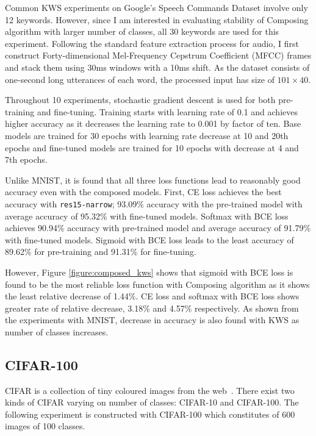 \documentclass{article}
\begin{document}
Common KWS experiments on Google’s Speech Commands Dataset involve only 12 keywords. However, since I am interested in evaluating stability of Composing algorithm with larger number of classes, all 30 keywords are used for this experiment. Following the standard feature extraction process for audio, I first construct Forty-dimensional Mel-Frequency Cepstrum Coefficient (MFCC) frames and stack them using 30ms windows with a 10ms shift. As the dataset consists of one-second long utterances of each word, the processed input has size of $101\times40$.

Throughout 10 experiments, stochastic gradient descent is used for both pre-training and fine-tuning. Training starts with learning rate of 0.1 and achieves higher accuracy as it decreases the learning rate to 0.001 by factor of ten. Base models are trained for 30 epochs with learning rate decrease at 10 and 20th epochs and fine-tuned models are trained for 10 epochs with decrease at 4 and 7th epochs.

Unlike MNIST, it is found that all three loss functions lead to reasonably good accuracy even with the composed models. First, CE loss achieves the best accuracy with \texttt{res15-narrow}; 93.09\% accuracy with the pre-trained model with average accuracy of 95.32\% with fine-tuned models. Softmax with BCE loss achieves 90.94\% accuracy with pre-trained model and average accuracy of 91.79\% with fine-tuned models. Sigmoid with BCE loss leads to the least accuracy of 89.62\% for pre-training and 91.31\% for fine-tuning.

However, Figure \ref{figure:composed_kws} shows that sigmoid with BCE loss is found to be the most reliable loss function with Composing algorithm as it shows the least relative decrease of 1.44\%. CE loss and softmax with BCE loss shows greater rate of relative decrease, 3.18\% and 4.57\% respectively. As shown from the experiments with MNIST, decrease in accuracy is also found with KWS as number of classes increases.

\subsection{CIFAR-100}
CIFAR is a collection of tiny coloured images from the web~\cite{krizhevsky2009learning}. There exist two kinds of CIFAR varying on number of classes: CIFAR-10 and CIFAR-100. The following experiment is constructed with CIFAR-100 which constitutes of 600 images of 100 classes.
\end{document}
